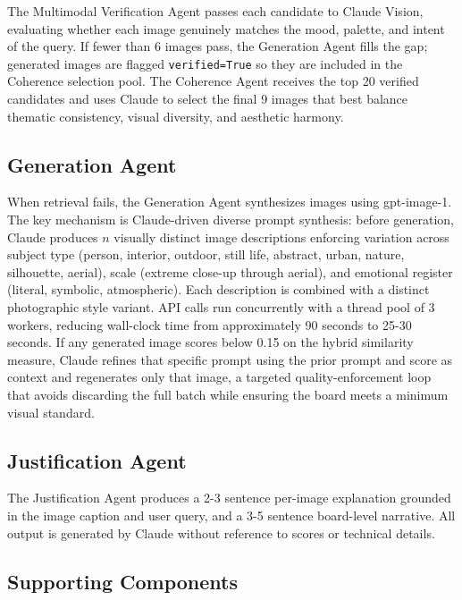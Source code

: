 \documentclass[
  11pt,
]{article}
\begin{document}
The Multimodal Verification Agent passes each candidate to Claude
Vision, evaluating whether each image genuinely matches the mood,
palette, and intent of the query. If fewer than 6 images pass, the
Generation Agent fills the gap; generated images are flagged
\texttt{verified=True} so they are included in the Coherence selection
pool. The Coherence Agent receives the top 20 verified candidates and
uses Claude to select the final 9 images that best balance thematic
consistency, visual diversity, and aesthetic harmony.

\subsection{Generation Agent}\label{generation-agent}

When retrieval fails, the Generation Agent synthesizes images using
gpt-image-1. The key mechanism is Claude-driven diverse prompt
synthesis: before generation, Claude produces \(n\) visually distinct
image descriptions enforcing variation across subject type (person,
interior, outdoor, still life, abstract, urban, nature, silhouette,
aerial), scale (extreme close-up through aerial), and emotional register
(literal, symbolic, atmospheric). Each description is combined with a
distinct photographic style variant. API calls run concurrently with a
thread pool of 3 workers, reducing wall-clock time from approximately 90
seconds to 25-30 seconds. If any generated image scores below 0.15 on
the hybrid similarity measure, Claude refines that specific prompt using
the prior prompt and score as context and regenerates only that image, a
targeted quality-enforcement loop that avoids discarding the full batch
while ensuring the board meets a minimum visual standard.

\subsection{Justification Agent}\label{justification-agent}

The Justification Agent produces a 2-3 sentence per-image explanation
grounded in the image caption and user query, and a 3-5 sentence
board-level narrative. All output is generated by Claude without
reference to scores or technical details.

\subsection{Supporting Components}\label{supporting-components}
\end{document}
